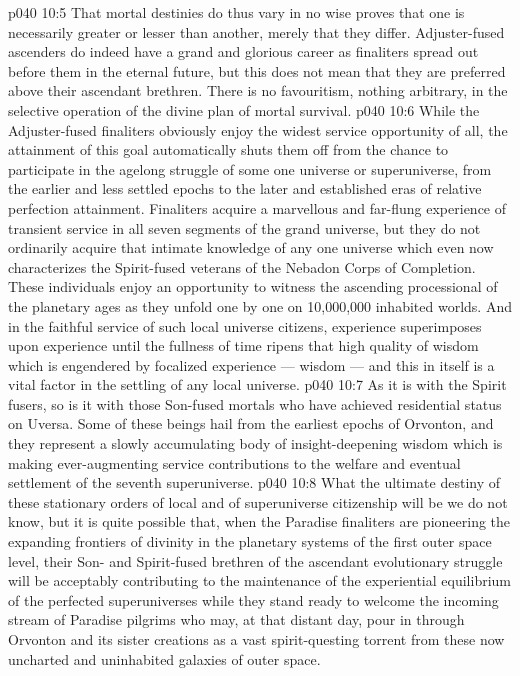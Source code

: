 \vs p040 10:5 \pc That mortal destinies do thus vary in no wise proves that one is necessarily greater or lesser than another, merely that they differ. Adjuster\hyp{}fused ascenders do indeed have a grand and glorious career as finaliters spread out before them in the eternal future, but this does not mean that they are preferred above their ascendant brethren. There is no favouritism, nothing arbitrary, in the selective operation of the divine plan of mortal survival.
\vs p040 10:6 \pc While the Adjuster\hyp{}fused finaliters obviously enjoy the widest service opportunity of all, the attainment of this goal automatically shuts them off from the chance to participate in the agelong struggle of some one universe or superuniverse, from the earlier and less settled epochs to the later and established eras of relative perfection attainment. Finaliters acquire a marvellous and far\hyp{}flung experience of transient service in all seven segments of the grand universe, but they do not ordinarily acquire that intimate knowledge of any one universe which even now characterizes the Spirit\hyp{}fused veterans of the Nebadon Corps of Completion. These individuals enjoy an opportunity to witness the ascending processional of the planetary ages as they unfold one by one on 10,000,000 inhabited worlds. And in the faithful service of such local universe citizens, experience superimposes upon experience until the fullness of time ripens that high quality of wisdom which is engendered by focalized experience ---  wisdom --- and this in itself is a vital factor in the settling of any local universe.
\vs p040 10:7 As it is with the Spirit fusers, so is it with those Son\hyp{}fused mortals who have achieved residential status on Uversa. Some of these beings hail from the earliest epochs of Orvonton, and they represent a slowly accumulating body of insight\hyp{}deepening wisdom which is making ever\hyp{}augmenting service contributions to the welfare and eventual settlement of the seventh superuniverse.
\vs p040 10:8 \pc What the ultimate destiny of these stationary orders of local and of superuniverse citizenship will be we do not know, but it is quite possible that, when the Paradise finaliters are pioneering the expanding frontiers of divinity in the planetary systems of the first outer space level, their Son\hyp{} and Spirit\hyp{}fused brethren of the ascendant evolutionary struggle will be acceptably contributing to the maintenance of the experiential equilibrium of the perfected superuniverses while they stand ready to welcome the incoming stream of Paradise pilgrims who may, at that distant day, pour in through Orvonton and its sister creations as a vast spirit\hyp{}questing torrent from these now uncharted and uninhabited galaxies of outer space.
